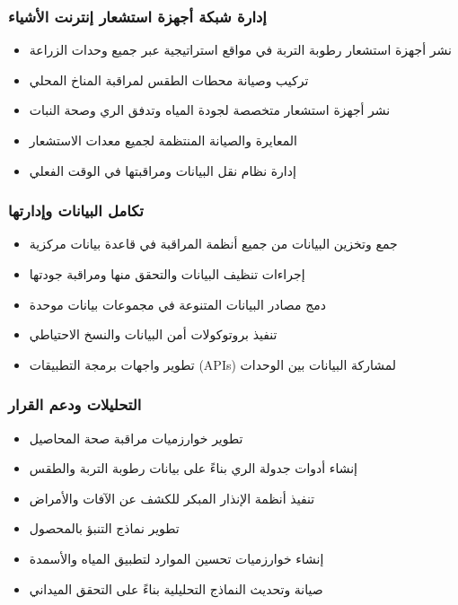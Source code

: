 \subsubsection{إدارة شبكة أجهزة استشعار إنترنت الأشياء}
\begin{itemize}
    \item نشر أجهزة استشعار رطوبة التربة في مواقع استراتيجية عبر جميع وحدات الزراعة
    \item تركيب وصيانة محطات الطقس لمراقبة المناخ المحلي
    \item نشر أجهزة استشعار متخصصة لجودة المياه وتدفق الري وصحة النبات
    \item المعايرة والصيانة المنتظمة لجميع معدات الاستشعار
    \item إدارة نظام نقل البيانات ومراقبتها في الوقت الفعلي
\end{itemize}

\subsubsection{تكامل البيانات وإدارتها}
\begin{itemize}
    \item جمع وتخزين البيانات من جميع أنظمة المراقبة في قاعدة بيانات مركزية
    \item إجراءات تنظيف البيانات والتحقق منها ومراقبة جودتها
    \item دمج مصادر البيانات المتنوعة في مجموعات بيانات موحدة
    \item تنفيذ بروتوكولات أمن البيانات والنسخ الاحتياطي
    \item تطوير واجهات برمجة التطبيقات (APIs) لمشاركة البيانات بين الوحدات
\end{itemize}

\subsubsection{التحليلات ودعم القرار}
\begin{itemize}
    \item تطوير خوارزميات مراقبة صحة المحاصيل
    \item إنشاء أدوات جدولة الري بناءً على بيانات رطوبة التربة والطقس
    \item تنفيذ أنظمة الإنذار المبكر للكشف عن الآفات والأمراض
    \item تطوير نماذج التنبؤ بالمحصول
    \item إنشاء خوارزميات تحسين الموارد لتطبيق المياه والأسمدة
    \item صيانة وتحديث النماذج التحليلية بناءً على التحقق الميداني
\end{itemize}

